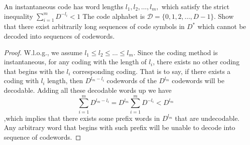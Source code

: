 \begin{exercise}{An instantaneous code has word lengths $l_{1}, l_{2}, \ldots, l_{m},$ which satisfy the strict inequality
  $\sum_{i=1}^{m} D^{-l_{i}}<1$
  The code alphabet is $\mathcal{D}=\{0,1,2, \ldots, D-1\} .$ Show that there exist arbitrarily long sequences of code symbols in $D^{*}$ which cannot be decoded into sequences of codewords.}
  \begin{proof}
  W.l.o.g., we assume $l_1\le l_2 \le \ldots \le l_m$. Since the coding method is instantaneous, for any coding with the length of $l_i$, there exists no other coding that begins with the $l_i$ corresponding coding. That is to say, if there exists a coding with $l_i$ length, then $D^{l_m-l_i}$ codewords of the $D^{l_m}$ codewords will be decodable. Adding all these decodable words up we have
  \begin{equation}
    \sum_{i=1}^{m} D^{l_m-l_i} = D^{l_m} \sum_{i=1}^{m} D^{-l_i} < D^{l_m}
  \end{equation}
  ,which implies that there exists some prefix words in $D^{l_m}$ that are undecodable. Any arbitrary word that begins with such prefix will be unable to decode into sequence of codewords.
  \end{proof}
  \label{ex5-1}
\end{exercise}

